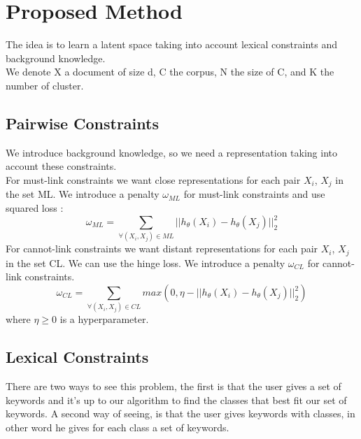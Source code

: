 \section{Proposed Method}
The idea is to learn a latent space taking into account lexical constraints and
background knowledge.
\\We denote  X a document of size d,
C the corpus, N the size of C, and K the number of cluster.
\subsection{Pairwise Constraints}
We introduce background knowledge, so we need
a representation taking into account these constraints.\\
For must-link constraints we want close representations for each pair $X_i$, $X_j$
in the set ML. We introduce a penalty $\omega_{ML}$ for must-link
constraints and use squared loss :
\begin{equation}\label{eq:omegaML}
  \omega_{ML} = \sum_{\forall{(X_i,X_j)\in ML}} || h_\theta(X_i) - h_\theta(X_j) ||_2^2
\end{equation}
For cannot-link constraints we want distant representations for each pair $X_i$,
$X_j$ in the set CL.
We can use the hinge loss.
We introduce a penalty $\omega_{CL}$ for cannot-link constraints.
\begin{equation}\label{eq:omegaCL}
  \omega_{CL} = \sum\limits_{\forall{(X_i,X_j)\in CL}} max(0,
  \eta - ||h_\theta(X_i) - h_\theta(X_j) ||_2^2)
\end{equation}
where $\eta \ge 0$ is a hyperparameter.\\
\subsection{Lexical Constraints}
There are two ways to see this problem, the first is that the user gives a set 
of keywords and it's up to our algorithm to find the classes that best fit our 
set of keywords. A second way of seeing, is that the user gives keywords with 
classes, in other word he gives for each class a set of keywords.
